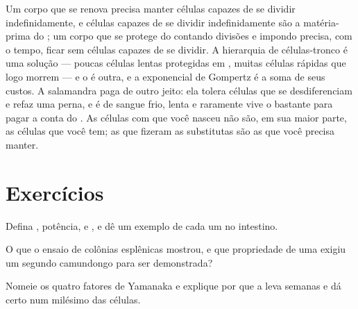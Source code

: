 \begin{remark}\label{rem:b3:stem-cells:remark}
Um corpo que se renova precisa manter células capazes de se dividir
indefinidamente, e células capazes de se dividir indefinidamente são a
matéria-prima do ; um corpo que se protege do  contando
divisões e impondo  precisa, com o tempo, ficar sem células
capazes de se dividir. A hierarquia de células-tronco é uma solução ---
poucas células lentas protegidas em , muitas células rápidas que
logo morrem --- e o  é outra, e a exponencial de
Gompertz é a soma de seus custos. A salamandra paga de outro jeito: ela
tolera células que se desdiferenciam e refaz uma perna, e é de sangue
frio, lenta e raramente vive o bastante para pagar a conta do . As
células com que você nasceu não são, em sua maior parte, as células que
você tem; as que fizeram as substitutas são as que você precisa manter.
\end{remark}

\section{Exercícios}

\begin{exercise}[$\star$]\label{exo:b3:stem-cells:1}
Defina , potência,  e , e dê um exemplo de cada um no intestino.
\end{exercise}

\begin{exercise}[$\star$]\label{exo:b3:stem-cells:2}
O que o ensaio de colônias esplênicas mostrou, e que propriedade de uma
 exigiu um segundo camundongo para ser demonstrada?
\end{exercise}

\begin{exercise}[$\star$]\label{exo:b3:stem-cells:3}
Nomeie os quatro fatores de Yamanaka e explique por que a 
leva semanas e dá certo num milésimo das células.
\end{exercise}

